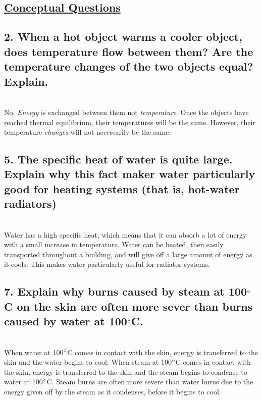 \documentclass{article}
\title{
    \vspace{2in}
    \textmd{\textbf{\hmwkTitle}}\\
    \vspace{0.5in}
    \textmd{\textbf{\hmwkClass}}\\
    \vspace{4in}
}
\author{\hmwkAuthorName}
\date{}
\begin{document}
\maketitle
\clearpage\shipout\null
\begin{center}
    \section*{\textbf{\underline {Conceptual Questions}}}
\end{center}

\subsection*{2. When a hot object warms a cooler object, does temperature flow between them? Are the temperature changes of the two objects equal? Explain.} \\

\large{No. \textit{Energy} is exchanged between them not \textit {temperature}. Once the objects have reached thermal equilibrium, their temperatures will be the same. However, their temperature \textit{changes} will not necessarily be the same.}

\subsection*{5. The specific heat of water is quite large. Explain why this fact maker water particularly good for heating systems (that is, hot-water radiators)} \\

\large{Water has a high specific heat, which means that it can absorb a lot of energy with a small increase in temperature. Water can be heated, then easily transported throughout a building, and will give off a large amount of energy as it cools. This makes water particularly useful for radiator systems.}

\subsection*{7. Explain why burns caused by steam at 100$\degree$C on the skin are often more sever than burns caused by water at 100$\degree$C.} \\

When water at 100$\degree$C comes in contact with the skin, energy is transferred to the skin and the water begins to cool. When steam at 100$\degree$C comes in contact with the skin, energy is transferred to the skin and the steam begins to condense to water at 100$\degree$C. Steam burns are often more severe than water burns due to the energy given off by the steam as it condenses, before it begins to cool.
\end{document}
